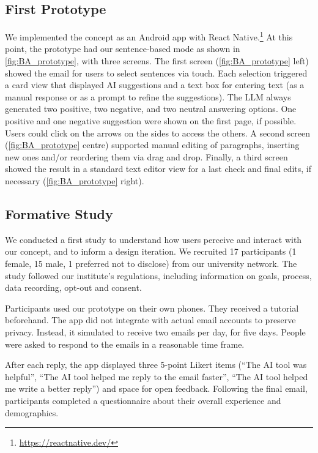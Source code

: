 \subsection{First Prototype}
We implemented the concept as an Android app with React Native.\footnote{\url{https://reactnative.dev/}}
At this point, the prototype had our sentence-based mode as shown in \cref{fig:BA_prototype}, with three screens.
The first screen (\cref{fig:BA_prototype} left) showed the email for users to select sentences via touch. Each selection triggered a card view that displayed AI suggestions and a text box for entering text (as a manual response or as a prompt to refine the suggestions).
The LLM always generated two positive, two negative, and two neutral answering options.
One positive and one negative suggestion were shown on the first page, if possible. Users could click on the arrows on the sides to access the others.
A second screen (\cref{fig:BA_prototype} centre) supported manual editing of paragraphs, inserting new ones and/or reordering them via drag and drop.
Finally, a third screen showed the result in a standard text editor view for a last check and final edits, if necessary (\cref{fig:BA_prototype} right). %


\subsection{Formative Study}\label{sec:formative_study}
We conducted a first study to understand how users perceive and interact with our concept, and to inform a design iteration. We recruited 17 participants (1 female, 15 male, 1 preferred not to disclose) from our university network. The study followed our institute's regulations, including information on goals, process, data recording, opt-out and consent.

Participants used our prototype on their own phones. They received a tutorial beforehand. The app did not integrate with actual email accounts to preserve privacy. Instead, it simulated to receive two emails per day, for five days.  People were asked to respond to the emails in a reasonable time frame. 

After each reply, the app displayed three 5-point Likert items (``The AI tool was helpful'', ``The AI tool helped me reply to the email faster'', ``The AI tool helped me write a better reply'') and space for open feedback. Following the final email, participants completed a questionnaire about their overall experience and demographics.


